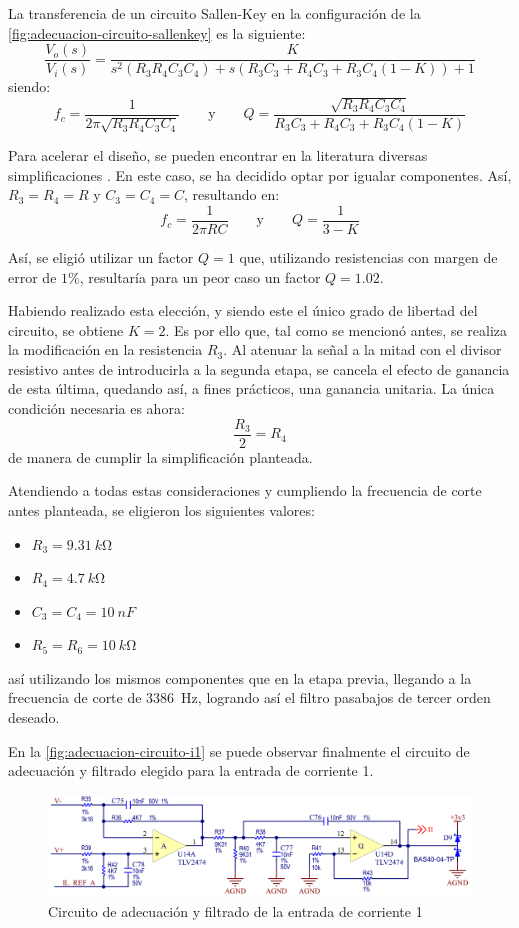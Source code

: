 \documentclass[titlepage, 12pt]{article}
\begin{document}
La transferencia de un circuito Sallen-Key en la configuración de la \autoref{fig:adecuacion-circuito-sallenkey} es la siguiente:
    \[
        \frac{V_o(s)}{V_i(s)} = \frac{K}{s^2(R_3R_4C_3C_4) + s(R_3C_3+R_4C_3+R_3C_4(1-K)) + 1}
    \]
siendo:
    \[
      f_c = \frac{1}{2\pi \sqrt{R_3R_4C_3C_4}} \qquad \text{y} \qquad Q = \frac{\sqrt{R_3R_4C_3C_4}}{R_3C_3+R_4C_3+R_3C_4(1-K)}
    \]

Para acelerar el diseño, se pueden encontrar en la literatura diversas simplificaciones \cite{ti:sloa024b}. En este caso, se ha decidido optar por igualar componentes. Así, $R_3 = R_4 = R$ y $C_3 = C_4 = C$, resultando en:
    \[
        f_c = \frac{1}{2\pi RC} \qquad \text{y} \qquad Q = \frac{1}{3 - K}
    \]

Así, se eligió utilizar un factor $Q=1$ que, utilizando resistencias con margen de error de $1 \%$, resultaría para un peor caso un factor $Q=1.02$.

Habiendo realizado esta elección, y siendo este el único grado de libertad del circuito, se obtiene $K=2$. Es por ello que, tal como se mencionó antes, se realiza la modificación en la resistencia $R_3$. Al atenuar la señal a la mitad con el divisor resistivo antes de introducirla a la segunda etapa, se cancela el efecto de ganancia de esta última, quedando así, a fines prácticos, una ganancia unitaria. La única condición necesaria es ahora:
    \[
        \frac{R_3}{2} = R_4
    \]
de manera de cumplir la simplificación planteada.

Atendiendo a todas estas consideraciones y cumpliendo la frecuencia de corte antes planteada, se eligieron los siguientes valores:
    \begin{itemize}
        \item $R_3 = \SI{9.31}{k\ohm}$
        \item $R_4 = \SI{4.7}{k\ohm}$
        \item $C_3 = C_4 = \SI{10}{nF}$
        \item $R_5 = R_6 = \SI{10}{k\ohm}$
    \end{itemize}
así utilizando los mismos componentes que en la etapa previa, llegando a la frecuencia de corte de \SI{3386}{Hz}, logrando así el filtro pasabajos de tercer orden deseado.

En la \autoref{fig:adecuacion-circuito-i1} se puede observar finalmente el circuito de adecuación y filtrado elegido para la entrada de corriente 1.

    \begin{figure}[!htbp]
        \centering
        \includegraphics[scale=0.32]{images/adecuacion-circuito.png}
        \caption{Circuito de adecuación y filtrado de la entrada de corriente 1}
        \label{fig:adecuacion-circuito-i1}
    \end{figure}
\end{document}
